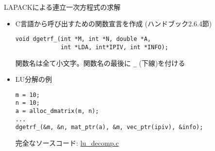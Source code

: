 \begin{frame}[t,fragile]{LAPACKによる連立一次方程式の求解}
  \begin{itemize}
    \setlength{\itemsep}{1em}
  \item C言語から呼び出すための関数宣言を作成 (ハンドブック2.6.4節)
\begin{lstlisting}
void dgetrf_(int *M, int *N, double *A,
             int *LDA, int*IPIV, int *INFO);
\end{lstlisting}
関数名は全て小文字。関数名の最後に {\tt \_} (下線)を付ける
\item LU分解の例
\begin{lstlisting}
m = 10;
n = 10;
a = alloc_dmatrix(m, n);
...
dgetrf_(&m, &n, mat_ptr(a), &m, vec_ptr(ipiv), &info);
\end{lstlisting}
完全なソースコード: \href{https://github.com/todo-group/computer-experiments/blob/master/exercise/linear_system/lu_decomp.c}{lu\_decomp.c}
  \end{itemize}
\end{frame}
